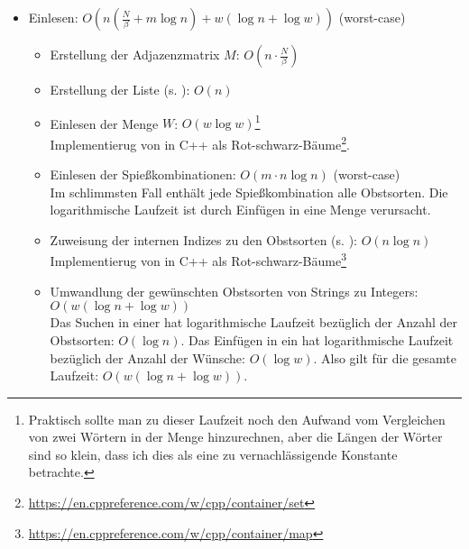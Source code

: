 \begin{itemize}
  \item Einlesen: $O(n (\frac{N}{\beta} + m \log n) + w (\log n + \log w))$ (worst-case)
  \begin{itemize}
    \item Erstellung der Adjazenzmatrix $M$: $O(n \cdot \frac{N}{\beta})$

    \item Erstellung der Liste  (s. ): $O(n)$

    \item Einlesen der Menge $W$: $O(w \log w)$\footnote{Praktisch sollte man zu dieser Laufzeit noch den Aufwand vom Vergleichen von zwei Wörtern in der Menge hinzurechnen, aber die Längen der Wörter sind so klein, dass
     ich dies als eine zu vernachlässigende Konstante betrachte.\label{foot:vergleich-aufwand}}\\
     Implementierug von  in C++ als Rot-schwarz-Bäume\footnote{\href{https://en.cppreference.com/w/cpp/container/set}{https://en.cppreference.com/w/cpp/container/set}}.

    \item Einlesen der Spießkombinationen: $O(m \cdot n \log n)$ (worst-case)\\
    Im schlimmsten Fall enthält jede Spießkombination alle Obstsorten.
    Die logarithmische Laufzeit ist durch Einfügen in eine Menge verursacht.

    \item Zuweisung der internen Indizes zu den Obstsorten (s. ): $O(n \log n)$\\
     Implementierug von  in C++ als Rot-schwarz-Bäume\footnote{\href{https://en.cppreference.com/w/cpp/container/map}{https://en.cppreference.com/w/cpp/container/map}}

    \item Umwandlung der gewünschten Obstsorten von Strings zu Integers: $O(w (\log n + \log w))$\\%
    Das Suchen in einer  hat logarithmische Laufzeit bezüglich der Anzahl
    der Obstsorten: $O(\log n)$.
    Das Einfügen in ein  hat logarithmische Laufzeit bezüglich der Anzahl
    der Wünsche: $O(\log w)$. Also gilt für die gesamte Laufzeit: $O(w (\log n + \log w))$. 


\end{itemize}
\end{itemize}
